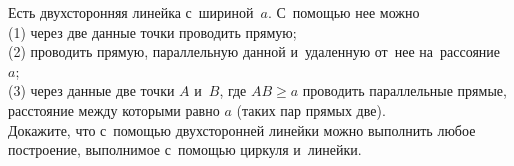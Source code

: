 \begin{problems}
\item
Есть двухсторонняя линейка с~шириной~$a$.
С~помощью нее можно
\\
(1)\enspace
через две данные точки проводить прямую;
\\
(2)\enspace
проводить прямую, параллельную данной и~удаленную от~нее на~рассояние~$a$;
\\
(3)\enspace
через данные две точки $A$ и~$B$, где $AB \geq a$ проводить параллельные
прямые, расстояние между которыми равно $a$ (таких пар прямых две).
\\
Докажите, что с~помощью двухсторонней линейки можно выполнить любое построение,
выполнимое с~помощью циркуля и~линейки.

\end{problems}

